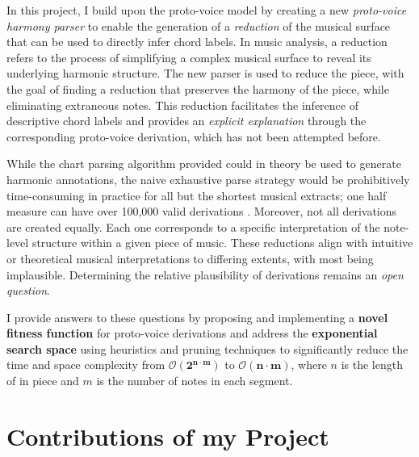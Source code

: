 \documentclass[12pt,a4paper,twoside,openany]{report} \usepackage[pdfborder={0 0 0}]{hyperref}    %
\theoremstyle{definition} \newtheorem{definition}{Definition}[section]
\begin{document}
    In this project, I build upon the proto-voice model by creating a new \textit{proto-voice harmony parser} to enable the generation of a \textit{reduction} of the musical
    surface that can be used to directly infer chord labels. In music analysis, a reduction refers to the process
    of simplifying a complex musical surface to reveal its underlying harmonic structure. 
    The new parser is used to reduce the piece, with the goal of finding a reduction that preserves the harmony of
    the piece, while eliminating extraneous notes. This reduction facilitates the inference of descriptive chord labels and provides an
    \textit{explicit explanation} through the corresponding proto-voice derivation, which has not been attempted before. 

    While the chart parsing algorithm provided \cite{finkensiepProtovoicesModelTonal2021} could in theory be used to
    generate harmonic annotations, the naive exhaustive parse strategy would be prohibitively time-consuming in
    practice for all but the shortest musical extracts; one half measure can have over 100,000 valid derivations
    \cite{finkensiepStructureFreePolyphony2023}. Moreover, not all derivations are created equally. Each one
    corresponds to a specific interpretation of the note-level structure within a given piece of music. These
    reductions align with intuitive or theoretical musical interpretations to differing extents, with most being implausible. 
    Determining the relative plausibility of derivations remains an \textit{open question}. 

    I provide answers to these questions by proposing and implementing a \textbf{novel fitness function} for
    proto-voice derivations and address the \textbf{exponential search space} using heuristics and pruning
    techniques to significantly reduce the time and space complexity from $\bm{\mathcal{O}(2^{n \cdot m})}$
      to $\bm{\mathcal{O}(n \cdot m)}$, where $n$ is the length of in piece and $m$ is the number of notes in each segment. 

    \section{Contributions of my Project}

\end{document}
